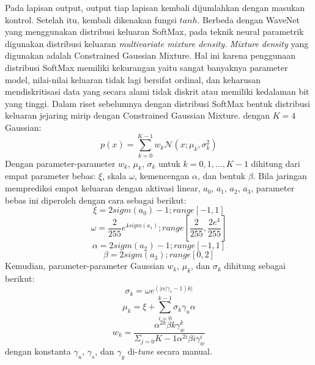 Pada lapisan output, output tiap lapisan kembali dijumlahkan dengan masukan kontrol. Setelah itu, kembali dikenakan fungsi $tanh$\parencite{bonada2017singing}. Berbeda dengan WaveNet \parencite{Oord2016WaveNetAG} yang menggunakan distribusi keluaran SoftMax, pada teknik neural parametrik digunakan distribusi keluaran \textit{multivariate mixture density}. \textit{Mixture density} yang digunakan adalah Constrained Gaussian Mixture. Hal ini karena penggunaan distribusi SoftMax memiliki kekurangan yaitu sangat banyaknya parameter model, nilai-nilai keluaran tidak lagi bersifat ordinal, dan keharusan mendiskritisasi data yang secara alami tidak diskrit atau memiliki kedalaman bit yang tinggi. Dalam riset sebelumnya dengan distribusi SoftMax bentuk distribusi keluaran jejaring mirip dengan Constrained Gaussian Mixture. dengan $K=4$ Gaussian: \parencite{bonada2017singing}
\begin{equation}
    p(x) = \sum\limits_{k=0}^{K-1}w_k\mathcal{N}(x;\mu_k,\sigma_k^2)
\end{equation}\label{eq-cgm}
Dengan parameter-parameter $w_k$, $\mu_k$, $\sigma_k$ untuk $k=0,1,...,K-1$ dihitung dari empat parameter bebas: $\xi$, skala $\omega$, kemencengan $\alpha$, dan bentuk $\beta$. Bila jaringan memprediksi empat keluaran dengan aktivasi linear, $a_0$, $a_1$, $a_2$, $a_3$, parameter bebas ini diperoleh dengan cara sebagai berikut: \parencite{bonada2017singing}
\begin{equation}
    \xi = 2 sigm(a_0)-1; range[-1,1]
\end{equation}\begin{equation}
    \omega = \dfrac{2}{255}e^{4sigm(a_1)}; range[\dfrac{2}{255}, \dfrac{2 e^4}{255}]
\end{equation}\begin{equation}
    \alpha = 2 sigm(a_2)-1; range[-1,1]
\end{equation}\begin{equation}
    \beta = 2 sigm(a_3); range[0,2]
\end{equation}
Kemudian, parameter-parameter Gaussian $w_k$, $\mu_k$, dan $\sigma_k$ dihitung sebagai berikut:\parencite{bonada2017singing}
\begin{equation}
    \sigma_k = \omega e^{(|\alpha|\gamma_s-1)k|}
\end{equation}\begin{equation}
    \mu_k = \xi + \sum\limits_{i=0}^{k-1}\sigma_k\gamma_u\alpha
\end{equation}\begin{equation}
    w_k = \dfrac{\alpha^{2k}\beta{k}\gamma_w^k}{\Sigma_{j=0}{K-1}\alpha^{2i}\beta{i}\gamma_w^i}
\end{equation}
dengan konstanta $\gamma_u$, $\gamma_s$, dan $\gamma_y$ di-\textit{tune} secara manual.

